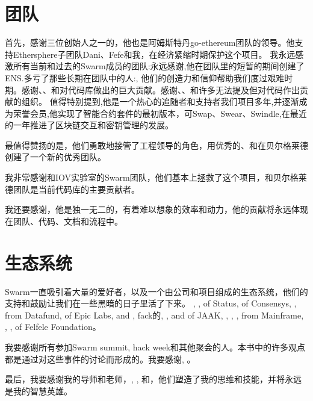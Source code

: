 \section*{团队}

首先，感谢三位创始人之一的，他也是阿姆斯特丹go-ethereum团队的领导。他支持Ethersphere子团队Dani、Fefe和我，在经济紧缩时期保护这个项目。
我永远感激所有当前和过去的Swarm成员的团队:永远感谢,他在团队里的短暂的期间创建了ENS.多亏了那些长期在团队中的人:,  他们的创造力和信仰帮助我们度过艰难时期。感谢、、和对代码库做出的巨大贡献。感谢、、和许多无法提及但对代码作出贡献的组织。
值得特别提到,他是一个热心的追随者和支持者我们项目多年,并逐渐成为荣誉会员,他实现了智能合约套件的最初版本，可Swap、Swear、Swindle,在最近的一年推进了区块链交互和密钥管理的发展。

最值得赞扬的是，他们勇敢地接管了工程领导的角色，用优秀的、和在贝尔格莱德创建了一个新的优秀团队。 

我非常感谢和IOV实验室的Swarm团队，他们基本上拯救了这个项目，和贝尔格莱德团队是当前代码库的主要贡献者。 

我还要感谢，他是独一无二的，有着难以想象的效率和动力，他的贡献将永远体现在团队、代码、文档和流程中。

\section*{生态系统}

Swarm一直吸引着大量的爱好者，以及一个由公司和项目组成的生态系统，他们的支持和鼓励让我们在一些黑暗的日子里活了下来。 
, ,  of Status,  of Consensys, ,  from Datafund,  of Epic Labs,  and , fack的, ,  and  of JAAK, , , ,  from Mainframe, , ,  of Felfele Foundation。 

我要感谢所有参加Swarm summit, hack week和其他聚会的人。本书中的许多观点都是通过对这些事件的讨论而形成的。我要感谢, 。

最后，我要感谢我的导师和老师，, , 和，他们塑造了我的思维和技能，并将永远是我的智慧英雄。

